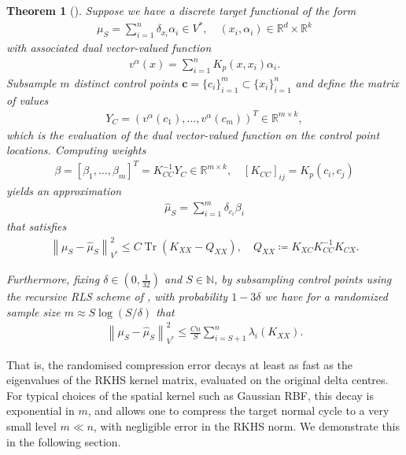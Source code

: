 \documentclass[sn-mathphys-num]{sn-jnl}%
\theoremstyle{thmstyleone}%
\newtheorem{thm}[theorem]{Theorem}
\theoremstyle{thmstyletwo}%
\theoremstyle{thmstylethree}%
\numberwithin{remark}{section}
\numberwithin{definition}{section}
\numberwithin{equation}{section}
\numberwithin{theorem}{section}
\newcommand{\norm}[1]{\left\lVert#1\right\rVert}
\newcommand{\N}{\ensuremath{\mathbb{N}}}%
\newcommand{\R}{\ensuremath{\mathbb{R}}}%
\begin{document}
\begin{thm}[\cite{SparseNystromCurrVar}]\label{oldthm}
     Suppose we have a discrete target functional of the form
    \begin{align*}
        \mu_{S}=\sum_{i=1}^{n}{\delta_{x_{i}}\alpha_{i}}  \in V^{*},\quad (x_{i},\alpha_{i}) \in \R^{d}\times \R^{k}
    \end{align*}
with associated dual vector-valued function
\begin{align*}
   v^{\alpha}(x) = \sum_{i=1}^{n}{K_{p}(x,x_{i})\alpha_{i}} .
\end{align*}
Subsample $m$ distinct control points $\bm{c}=\{c_{i}\}_{i=1}^{m} \subset \{x_{i}\}_{i=1}^{n}$ and define the matrix of values 
    \begin{align*}
        Y_{C} = (v^{\alpha}(c_{1}),\dots,v^{\alpha}(c_{m}))^{T} \in \R^{m\times k},
    \end{align*}
    which is the evaluation of the dual vector-valued function on the control point locations. 
    Computing weights
    \begin{align*}
        \beta = [\beta_{1},\dots,\beta_{m}]^{T}= K_{CC}^{-1}Y_{C} \in \R^{m\times k},\quad [K_{CC}]_{ij}=K_{p}(c_{i},c_{j})
    \end{align*}
    yields an approximation
    \begin{align*}
       \hat{\mu}_{S}=   \sum_{i=1}^{m}{\delta_{c_{i}}\beta_{i} } %
    \end{align*} 
    that satisfies
       \begin{align}\label{tracebound}
      \norm{\mu_{S}-\hat{\mu}_{S} }_{V^{*}}^{2} \leq C\operatorname{Tr}(K_{XX}-Q_{XX}),\quad Q_{XX}\coloneq K_{XC}K_{CC}^{-1}K_{CX}.
    \end{align}

Furthermore, fixing $\delta\in (0,\frac{1}{32})$ and $S\in \N$, by subsampling control points using the recursive RLS scheme of \cite{Musco}, with probability $1-3\delta$ we have for a randomized sample size $m\approx  S\log(S/\delta)$ that
   \begin{align}\label{eigenbound}
        \norm{{\mu_{S} - \hat{\mu}_{S} }}_{V^{*}}^{2} \leq \frac{Cn}{S}\sum_{i=S+1}^{n}{\lambda_{i}(K_{XX})}.
    \end{align}
\end{thm}

That is, the randomised compression error decays at least as fast as the eigenvalues of the RKHS kernel matrix, evaluated on the original delta centres. For typical choices of the spatial kernel such as Gaussian RBF, this decay is exponential \cite{SparseNystromCurrVar} in $m$, and allows one to compress the target normal cycle to a very small level $m\ll n$, with negligible error in the RKHS norm. We demonstrate this in the following section.
\end{document}
